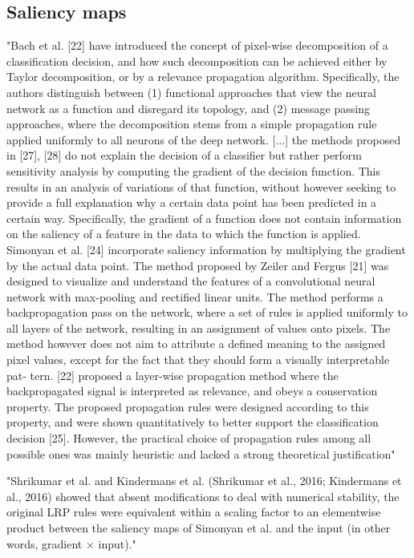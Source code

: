 	\subsection{Saliency maps}
	"Bach et al. [22] have introduced the concept of pixel-wise decomposition of a classification decision, and how such decomposition can be achieved either by Taylor decomposition, or by a relevance propagation algorithm. Specifically, the authors distinguish between (1) functional approaches that view the neural network as a function and disregard its topology, and (2) message passing approaches, where the decomposition stems from a simple propagation rule applied uniformly to all neurons of the deep network.
	[...]
	the methods proposed in [27], [28] do not explain the decision of a classifier but rather perform sensitivity analysis by computing the gradient of the decision function. This results in an analysis of variations of that function, without however seeking to provide a full explanation why a certain data point has been predicted in a certain way. Specifically, the gradient of a function does not contain information on the saliency of a feature in the data to which the function is applied. Simonyan et al. [24] incorporate saliency information by multiplying the gradient by the actual data point.
	The method proposed by Zeiler and Fergus [21] was designed to visualize and understand the features of a convolutional neural network with max-pooling and rectified linear units. The method performs a backpropagation pass on the network, where a set of rules is applied uniformly to all layers of the network, resulting in an assignment of values onto pixels. The method however does not aim to attribute a defined meaning to the assigned pixel values, except for the fact that they should form a visually interpretable pat- tern. [22] proposed a layer-wise propagation method where the backpropagated signal is interpreted as relevance, and obeys a conservation property. The proposed propagation rules were designed according to this property, and were shown quantitatively to better support the classification decision [25]. However, the practical choice of propagation rules among all possible ones was mainly heuristic and lacked a strong theoretical justification" \cite{Montavon2017}
	
	"Shrikumar et al. and Kindermans et al. (Shrikumar et al., 2016; Kindermans et al., 2016) showed that absent modifications to deal with numerical stability, the original LRP rules were equivalent within a scaling factor to an elementwise product between the saliency maps of Simonyan et al. and the input (in other words, gradient × input)." \cite{Shrikumar2017}
	
